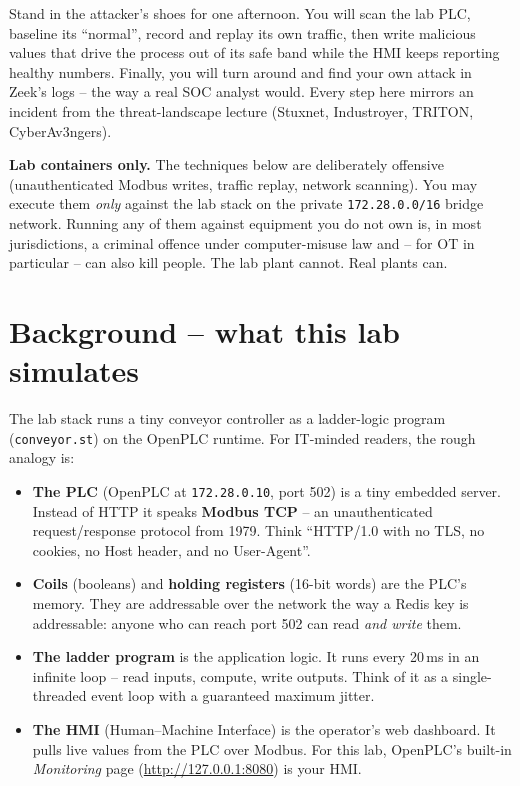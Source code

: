 \documentclass[11pt,a4paper]{article}
\begin{document}
\labheader

\begin{goalbox}
Stand in the attacker's shoes for one afternoon. You will scan the lab
PLC, baseline its ``normal'', record and replay its own traffic, then
write malicious values that drive the process out of its safe band
while the HMI keeps reporting healthy numbers. Finally, you will turn
around and find your own attack in Zeek's logs -- the way a real SOC
analyst would. Every step here mirrors an incident from the
threat-landscape lecture (Stuxnet, Industroyer, TRITON, CyberAv3ngers).
\end{goalbox}

\begin{warnbox}
\textbf{Lab containers only.} The techniques below are deliberately
offensive (unauthenticated Modbus writes, traffic replay, network
scanning). You may execute them \emph{only} against the lab stack on
the private \texttt{172.28.0.0/16} bridge network. Running any of
them against equipment you do not own is, in most jurisdictions, a
criminal offence under computer-misuse law and -- for OT in particular
-- can also kill people. The lab plant cannot. Real plants can.
\end{warnbox}

\section*{Background -- what this lab simulates}

The lab stack runs a tiny conveyor controller as a ladder-logic
program (\texttt{conveyor.st}) on the OpenPLC runtime. For IT-minded
readers, the rough analogy is:

\begin{itemize}\setlength{\itemsep}{1pt}
  \item \textbf{The PLC} (OpenPLC at \texttt{172.28.0.10}, port 502)
        is a tiny embedded server. Instead of HTTP it speaks
        \textbf{Modbus TCP} -- an unauthenticated request/response
        protocol from 1979. Think ``HTTP/1.0 with no TLS, no
        cookies, no Host header, and no User-Agent''.
  \item \textbf{Coils} (booleans) and \textbf{holding registers}
        (16-bit words) are the PLC's memory. They are addressable
        over the network the way a Redis key is addressable: anyone
        who can reach port 502 can read \emph{and write} them.
  \item \textbf{The ladder program} is the application logic. It runs
        every 20\,ms in an infinite loop -- read inputs, compute,
        write outputs. Think of it as a single-threaded event loop
        with a guaranteed maximum jitter.
  \item \textbf{The HMI} (Human--Machine Interface) is the operator's
        web dashboard. It pulls live values from the PLC over Modbus.
        For this lab, OpenPLC's built-in \emph{Monitoring} page
        (\url{http://127.0.0.1:8080}) is your HMI.
\end{itemize}
\end{document}
